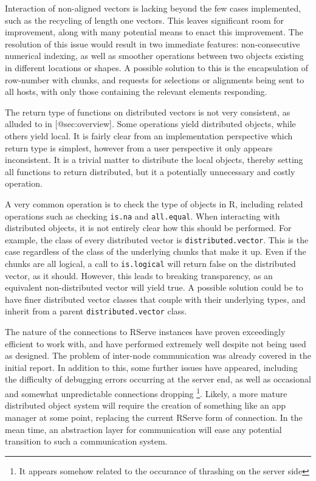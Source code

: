 Interaction of non-aligned vectors is lacking beyond the few cases
implemented, such as the recycling of length one vectors. This leaves
significant room for improvement, along with many potential means to
enact this improvement. The resolution of this issue would result in two
immediate features: non-consecutive numerical indexing, as well as
smoother operations between two objects existing in different locations
or shapes. A possible solution to this is the encapsulation of
row-number with chunks, and requests for selections or alignments being
sent to all hosts, with only those containing the relevant elements
responding.

The return type of functions on distributed vectors is not very
consistent, as alluded to in {[}@sec:overview{]}. Some operations yield
distributed objects, while others yield local. It is fairly clear from
an implementation perspective which return type is simplest, however
from a user perspective it only appears inconsistent. It is a trivial
matter to distribute the local objects, thereby setting all functions to
return distributed, but it a potentially unnecessary and costly
operation.

A very common operation is to check the type of objects in R, including
related operations such as checking \texttt{is.na} and
\texttt{all.equal}. When interacting with distributed objects, it is not
entirely clear how this should be performed. For example, the class of
every distributed vector is \texttt{distributed.vector}. This is the
case regardless of the class of the underlying chunks that make it up.
Even if the chunks are all logical, a call to \texttt{is.logical} will
return false on the distributed vector, as it should. However, this
leads to breaking transparency, as an equivalent non-distributed vector
will yield true. A possible solution could be to have finer distributed
vector classes that couple with their underlying types, and inherit from
a parent \texttt{distributed.vector} class.

The nature of the connections to RServe instances have proven
exceedingly efficient to work with, and have performed extremely well
despite not being used as designed. The problem of inter-node
communication was already covered in the initial report. In addition to
this, some further issues have appeared, including the difficulty of
debugging errors occurring at the server end, as well as occasional and
somewhat unpredictable connections dropping \footnote{It appears somehow
  related to the occurance of thrashing on the server side}. Likely, a
more mature distributed object system will require the creation of
something like an app manager at some point, replacing the current
RServe form of connection. In the mean time, an abstraction layer for
communication will ease any potential transition to such a communication
system.

